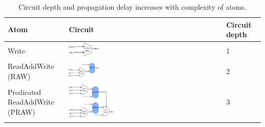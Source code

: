 \begin{table}[!t]
  \begin{scriptsize}
    \begin{tabular}{|p{}|p{}|p{}|}
  \hline
  Atom & Circuit & Circuit depth \\
  \hline
  Write & \includegraphics[width=0.2\textwidth]{rw.pdf} & 1 \\
  \hline
  ReadAddWrite (RAW) & \includegraphics[width=0.2\textwidth]{raw.pdf} & 2\\
  \hline
  \pbox{0.1\textwidth}
  {Predicated\\
  ReadAddWrite (PRAW)} & \includegraphics[width=0.3\textwidth]{pred_raw.pdf}  & 3\\
  \hline
  \end{tabular}
\end{scriptsize}
\caption{Circuit depth and propagation delay increases with complexity of atoms.}
  \label{fig:circuit_depth}
\end{table}

